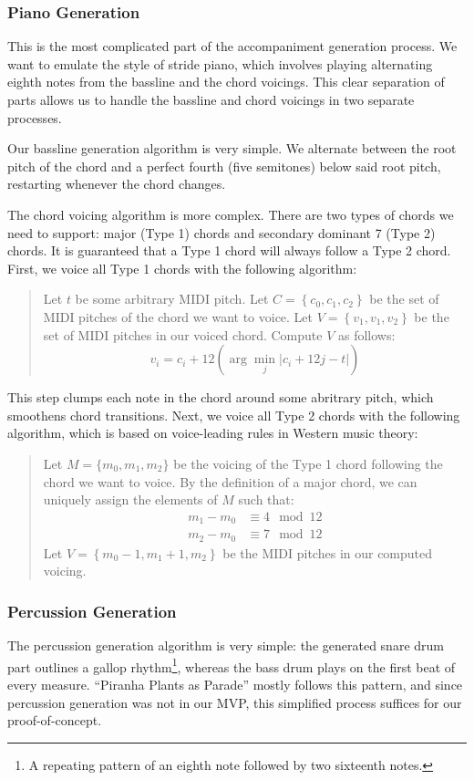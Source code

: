 \subsubsection{Piano Generation}

This is the most complicated part of the accompaniment generation process. We want to emulate the style of stride piano, which involves playing alternating eighth notes from the bassline and the chord voicings. This clear separation of parts allows us to handle the bassline and chord voicings in two separate processes.

Our bassline generation algorithm is very simple. We alternate between the root pitch of the chord and a perfect fourth (five semitones) below said root pitch, restarting whenever the chord changes.

The chord voicing algorithm is more complex. There are two types of chords we need to support: major (Type 1) chords and secondary dominant 7 (Type 2) chords. It is guaranteed that a Type 1 chord will always follow a Type 2 chord. First, we voice all Type 1 chords with the following algorithm:
\begin{quote}
    Let $t$ be some arbitrary MIDI pitch.
    Let $C = \left\{ c_0, c_1, c_2 \right\}$ be the set of MIDI pitches of the chord we want to voice.
    Let $V = \left\{ v_1, v_1, v_2 \right\}$ be the set of MIDI pitches in our voiced chord.
    Compute $V$ as follows:
    $$v_i = c_i + 12 \left( \arg\min_{j} \left\vert c_i + 12j - t \right\vert \right)$$
\end{quote}
This step clumps each note in the chord around some abritrary pitch, which smoothens chord transitions. Next, we voice all Type 2 chords with the following algorithm, which is based on voice-leading rules in Western music theory:
\begin{quote}
    Let $M = \{ m_0, m_1, m_2\}$ be the voicing of the Type 1 chord following the chord we want to voice. By the definition of a major chord, we can uniquely assign the elements of $M$ such that:
    \begin{align*}
        m_1 - m_0 &\equiv 4 \mod 12 \\
        m_2 - m_0 &\equiv 7 \mod 12
    \end{align*}
    Let $V = \left\{ m_0 - 1, m_1 + 1, m_2 \right\}$ be the MIDI pitches in our computed voicing.
\end{quote}

\subsubsection{Percussion Generation}

The percussion generation algorithm is very simple: the generated snare drum part outlines a gallop rhythm\footnote{A repeating pattern of an eighth note followed by two sixteenth notes.}, whereas the bass drum plays on the first beat of every measure. ``Piranha Plants as Parade'' mostly follows this pattern, and since percussion generation was not in our MVP, this simplified process suffices for our proof-of-concept.